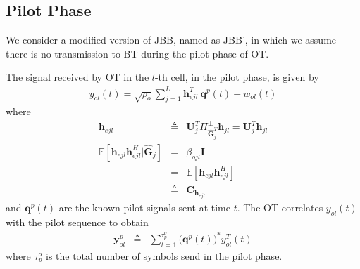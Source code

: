 \documentclass[10pt, a4paper, twoside,fleqn]{article}
\begin{document}
\subsection{Pilot Phase}
    We consider a modified version of JBB, named as JBB', in which we assume there is no transmission to BT during the pilot phase of OT. 
    
    The signal received by OT in the $l$-th cell, in the pilot phase, is given by
\begin{eqnarray}\label{eqn:rcvotpilot}
	y_{ol}(t)=\sqrt{\rho_o} \sum_{j=1}^{L} \pmb{h}^T_{ejl} \ \pmb{q}^p(t) + w_{ol}(t) 
\end{eqnarray}
where
\begin{eqnarray}
	\pmb{h}_{ejl} &\triangleq& \pmb{U}_j^T\Pi^{\perp}_{{\widehat{\pmb{G}}^T_j}}\pmb{h}_{jl} = \pmb{U}_j^T\pmb{h}_{jl} \\
    \mathbb{E}[\pmb{h}_{ejl}\pmb{h}^H_{ejl}|\pmb{\widehat{G}}_j] &=& \beta_{ojl}\pmb{I} \nonumber \\
                    &=& \mathbb{E}[\pmb{h}_{ejl}\pmb{h}^H_{ejl}] \nonumber \\
                                           &\triangleq& \pmb{C}_{\pmb{h}_{ejl}} \nonumber
\end{eqnarray}
and $\pmb{q}^p(t)$ are the known pilot signals sent at time $t$.
The OT correlates $y_{ol}(t)$ with the pilot sequence to obtain
\begin{eqnarray}
	\pmb{y}_{ol}^{p} &\triangleq& \sum_{t=1}^{\tau_p^o} \Big(\pmb{q}^{p}(t)\Big)^* y^T_{ol}(t)\nonumber
\end{eqnarray}
where $\tau_p^o$ is the total number of symbols send in the pilot phase.
\end{document}
